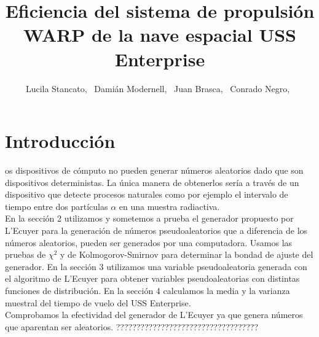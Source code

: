 \documentclass[10pt,journal,compsoc]{IEEEtran}
\begin{document}
\title{Eficiencia del sistema de propulsi\'on WARP de la nave espacial USS Enterprise}


\author{Lucila Stancato,~
		Dami\'an Modernell,~
		Juan Brasca,~
		Conrado Negro,~%

}


\maketitle

\IEEEdisplaynotcompsoctitleabstractindextext

\IEEEpeerreviewmaketitle

\section{Introducci\'on}

os dispositivos de c\'omputo no pueden generar n\'umeros aleatorios dado que 
son dispositivos deterministas. La \'unica manera de obtenerlos ser\'ia a trav\'es de un dispositivo
que detecte procesos naturales como por ejemplo el intervalo de tiempo entre dos part\'iculas $\alpha$
en una muestra radiactiva.\\
En la secci\'on 2 utilizamos y sometemos a prueba el generador propuesto por L'Ecuyer para la
generaci\'on de n\'umeros pseudoaleatorios que a diferencia de los n\'umeros aleatorios, pueden 
ser generados por una computadora. Usamos las pruebas de $\chi^2$ y de Kolmogorov-Smirnov para determinar la bondad de ajuste del
generador. En la secci\'on 3 utilizamos una variable pseudoaleatoria generada con el algoritmo de L'Ecuyer para
obtener variables pseudoaleatorias con distintas funciones de distribuci\'on. En la secci\'on 4 
calculamos la media y la varianza muestral del tiempo de vuelo del USS Enterprise.\\
Comprobamos la efectividad del generador de L'Ecuyer ya que genera n\'umeros que aparentan ser 
aleatorios. ???????????????????????????????????
\end{document}

